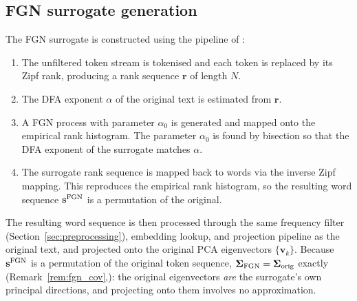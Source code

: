 \documentclass[preprint]{elsarticle}
\newcommand{\vk}{\mathbf{v}_k}
\newcommand{\Sig}{\boldsymbol{\Sigma}}
\begin{document}
\subsection{FGN surrogate generation}
\label{sec:fgn_pipeline}

The FGN surrogate is constructed using the pipeline of
\citet{DegliEsposti2025}:
\begin{enumerate}
  \item The unfiltered token stream is tokenised and each token is
        replaced by its Zipf rank, producing a rank sequence
        $\mathbf{r}$ of length $N$.
  \item The DFA exponent $\alpha$ of the original text is estimated
        from $\mathbf{r}$.
  \item A FGN process with parameter $\alpha_0$ is generated and
        mapped onto the empirical rank histogram.
        The parameter $\alpha_0$ is found by bisection so that the
        DFA exponent of the surrogate matches $\alpha$.
  \item The surrogate rank sequence is mapped back to words via the
        inverse Zipf mapping. This reproduces the empirical rank
        histogram, so the resulting word sequence
        $\mathbf{s}^{\rm FGN}$ is a permutation of the original.
\end{enumerate}
The resulting word sequence is then processed through the same
frequency filter (Section~\ref{sec:preprocessing}), embedding lookup,
and projection pipeline as the original text, and projected onto the
original PCA eigenvectors $\{\vk\}$.
Because $\mathbf{s}^{\rm FGN}$ is a permutation of the original token
sequence, $\Sig_{\rm FGN}=\Sig_{\rm orig}$ exactly
(Remark~\ref{rem:fgn_cov},): the original eigenvectors \emph{are} the
surrogate's own principal directions, and projecting onto them involves
no approximation.

%
%
\end{document}
